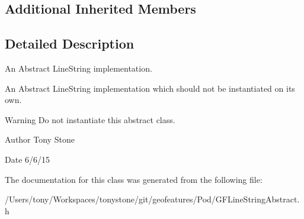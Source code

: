 \subsection*{Additional Inherited Members}


\subsection{Detailed Description}
An Abstract Line\+String implementation. 

An Abstract Line\+String implementation which should not be instantiated on it\textquotesingle{}s own.

\begin{DoxyWarning}{Warning}
Do not instantiate this abstract class.
\end{DoxyWarning}
\begin{DoxyAuthor}{Author}
Tony Stone 
\end{DoxyAuthor}
\begin{DoxyDate}{Date}
6/6/15 
\end{DoxyDate}


The documentation for this class was generated from the following file\+:\begin{DoxyCompactItemize}
\item 
/\+Users/tony/\+Workspaces/tonystone/git/geofeatures/\+Pod/G\+F\+Line\+String\+Abstract.\+h\end{DoxyCompactItemize}
